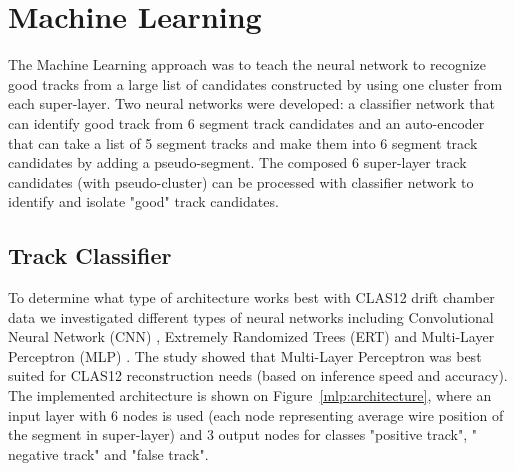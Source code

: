 \section{Machine Learning}

The Machine Learning approach was to teach the neural network to recognize good tracks
 from a large list of candidates constructed by using one cluster from each super-layer.
 Two neural networks were developed: a classifier network that can identify good track from  6 segment
 track candidates  and an auto-encoder that can take a list of 5 segment tracks and make them into 6 segment 
 track candidates by adding a pseudo-segment. The composed 6 super-layer track candidates (with pseudo-cluster)
 can be processed with classifier network to identify and isolate "good" track candidates.

 
 \subsection{Track Classifier}
 
 To determine what type of architecture works best with CLAS12 drift chamber data we investigated different 
 types of neural networks  \cite{Gavalian:2020oxg} including Convolutional Neural Network (CNN) , Extremely Randomized Trees (ERT) \cite{scikitlearn-extratreesclassifier} and 
 Multi-Layer Perceptron (MLP) \cite{scikitlearn-mlpclassifier}. The study showed that Multi-Layer Perceptron was best suited for 
 CLAS12 reconstruction needs (based on inference speed and accuracy). The implemented architecture is shown on 
 Figure~\ref{mlp:architecture}, where an input layer with 6 nodes is used (each node representing average wire position 
 of the segment in super-layer) and 3 output nodes for classes "positive track", " negative track" and "false track".
 
